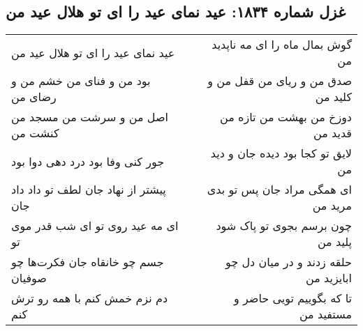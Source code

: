 \begin{center}
\section*{غزل شماره ۱۸۳۴: عید نمای عید را ای تو هلال عید من}
\label{sec:1834}
\begin{longtable}{l p{0.5cm} r}
عید نمای عید را ای تو هلال عید من
&&
گوش بمال ماه را ای مه ناپدید من
\\
بود من و فنای من خشم من و رضای من
&&
صدق من و ریای من قفل من و کلید من
\\
اصل من و سرشت من مسجد من کنشت من
&&
دوزخ من بهشت من تازه من قدید من
\\
جور کنی وفا بود درد دهی دوا بود
&&
لایق تو کجا بود دیده جان و دید من
\\
پیشتر از نهاد جان لطف تو داد داد جان
&&
ای همگی مراد جان پس تو بدی مرید من
\\
ای مه عید روی تو ای شب قدر موی تو
&&
چون برسم بجوی تو پاک شود پلید من
\\
جسم چو خانقاه جان فکرت‌ها چو صوفیان
&&
حلقه زدند و در میان دل چو ابایزید من
\\
دم نزم خمش کنم با همه رو ترش کنم
&&
تا که بگوییم تویی حاضر و مستفید من
\\
\end{longtable}
\end{center}
